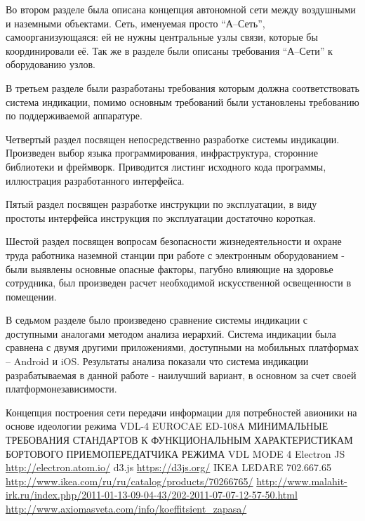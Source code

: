 \documentclass[a4paper,12pt]{report} %
\begin{document}
Во втором разделе была описана концепция автономной сети между воздушными и
наземными объектами. Сеть, именуемая просто ``А--Сеть'', самоорганизующаяся: ей
не нужны центральные узлы связи, которые бы координировали её. Так же в разделе
были описаны требования ``А--Сети'' к оборудованию узлов.

В третьем разделе были разработаны требования которым должна соответствовать
система индикации, помимо основным требований были установлены требованию по
поддерживаемой аппаратуре.

Четвертый раздел посвящен непосредственно разработке системы индикации.
Произведен выбор языка программирования, инфраструктура, сторонние библиотеки и
фреймворк. Приводится листинг исходного кода программы, иллюстрация
разработанного интерфейса.

Пятый раздел посвящен разработке инструкции по эксплуатации, в виду простоты
интерфейса инструкция по эксплуатации достаточно короткая.

Шестой раздел посвящен вопросам безопасности жизнедеятельности и охране труда
работника наземной станции при работе с электронным оборудованием - были
выявлены основные опасные факторы, пагубно влияющие на здоровье сотрудника, был
произведен расчет необходимой искусственной освещенности в помещении.

В седьмом разделе было произведено сравнение системы индикации с доступными
аналогами методом анализа иерархий. Система индикации была сравнена с двумя
другими приложениями, доступными на мобильных платформах -- Android и iOS.
Результаты анализа показали что система индикации разрабатываемая в данной
работе - наилучший вариант, в основном за счет своей платформонезависимости.
\newpage


\begin{thebibliography}{9}
  Концепция построения сети передачи информации для потребностей авионики на
  основе идеологии режима VDL-4 
  EUROCAE ED-108A МИНИМАЛЬНЫЕ ТРЕБОВАНИЯ СТАНДАРТОВ К ФУНКЦИОНАЛЬНЫМ
  ХАРАКТЕРИСТИКАМ БОРТОВОГО ПРИЕМОПЕРЕДАТЧИКА РЕЖИМА VDL MODE 4 
  Electron JS \url{http://electron.atom.io/}
  d3.js \url{https://d3js.org/}
  IKEA LEDARE 702.667.65 \url{http://www.ikea.com/ru/ru/catalog/products/70266765/}
  \url{http://www.malahit-irk.ru/index.php/2011-01-13-09-04-43/202-2011-07-07-12-57-50.html}
  \url{http://www.axiomasveta.com/info/koeffitsient_zapasa/}
\end{thebibliography}
\end{document}
